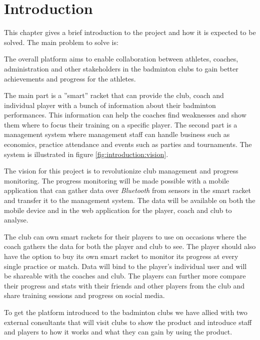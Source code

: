 \chapter{Introduction}
This chapter gives a brief introduction to the project and how it is expected to be solved.
The main problem to solve is:


The overall platform aims to enable collaboration between athletes, coaches, administration and other stakeholders in the badminton clubs to gain better achievements and progress for the athletes.

The main part is a ''smart'' racket that can provide the club, coach and individual player with a bunch of information about their badminton performances. 
This information can help the coaches find weaknesses and show them where to focus their training on a specific player.
The second part is a management system where management staff can handle business such as economics, practice attendance and events such as parties and tournaments. 
The system is illustrated in figure \ref{fig:introduction:vision}.


The vision for this project is to revolutionize club management and progress monitoring. 
The progress monitoring will be made possible with a mobile application that can gather data over \textit{Bluetooth} from sensors in the smart racket and transfer it to the management system. 
The data will be available on both the mobile device and in the web application for the player, coach and club to analyse.

The club can own smart rackets for their players to use on occasions where the coach gathers the data for both the player and club to see. 
The player should also have the option to buy its own smart racket to monitor its progress at every single practice or match.
Data will bind to the player's individual user and will be shareable with the coaches and club. 
The players can further more compare their progress and stats with their friends and other players from the club and share training sessions and progress on social media.

To get the platform introduced to the badminton clubs we have allied with two external consultants that will visit clubs to show the product and introduce staff and players to how it works and what they can gain by using the product.

